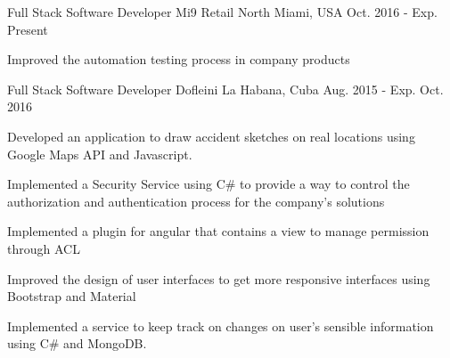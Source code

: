 


\begin{cventries}


\cventry
{Full Stack Software Developer} %
{Mi9 Retail} %
{North Miami, USA} %
{Oct. 2016 - Exp. Present} %
{ %
\begin{cvitems}
    \item {Improved the automation testing process in company products}
\end{cvitems}
}

\cventry
{Full Stack Software Developer} %
{Dofleini} %
{La Habana, Cuba} %
{Aug. 2015 - Exp. Oct. 2016} %
{ %
\begin{cvitems}
\item {Developed an application to draw accident sketches on real locations using Google Maps API and
Javascript.}
\item {Implemented a Security Service using C\# to provide a way to control the authorization and authentication
process for the company's solutions}
\item {Implemented a plugin for angular that contains a view to manage permission through ACL}
\item {Improved the design of user interfaces to get more responsive interfaces using Bootstrap and Material}
\item {Implemented a service to keep track on changes on user's sensible information using C\# and MongoDB.}
\end{cvitems}
}



\end{cventries}

